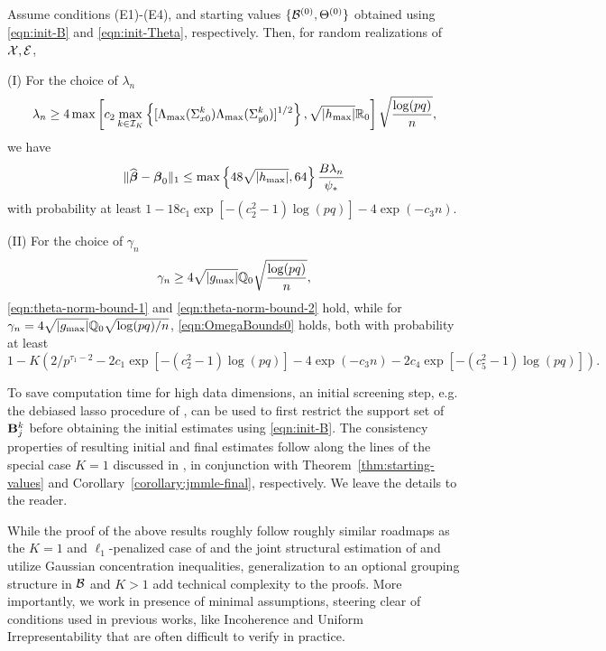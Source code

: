 \begin{corollary}\label{corollary:jmmle-final}
Assume conditions (E1)-(E4), and starting values $\{ {\cal{B}}^{(0)}, \Theta^{(0)} \}$ obtained using \eqref{eqn:init-B} and \eqref{eqn:init-Theta}, respectively. Then, for random realizations of ${\cal{X}}, {\cal{E}}$,
%

\vspace{1em}
\noindent (I) For the choice of $\lambda_n$
%
$$
\lambda_n \geq 4 \max \left[ c_2 \max_{k \in {\cal{I}}_K} \left\{ [\Lambda_{\max} (\Sigma_{x 0}^k) \Lambda_{\max} (\Sigma_{y 0}^k)]^{1/2} \right\}, \sqrt{| h_{\max}|} {\mathbb{R}}_0 \right] \sqrt{\frac{\log(pq)}{n}},
$$
%
we have
%
$$
\| \widehat {{\boldsymbol{\beta}}} - {\boldsymbol{\beta}}_0 \|_1 \leq \max \left\{ 48 \sqrt{ | h_{\max} |}, 64 \right\} \frac{B \lambda_n}{\psi_*}
$$
%
with probability at least $1 - 18 c_1 \exp[-(c_2^2-1) \log(pq)] - 4 \exp( -c_3 n)$.

\vspace{1em}
\noindent (II) For the choice of $\gamma_n$
%
$$
\gamma_n \geq 4 \sqrt{ | g_{\max} |} {\mathbb{Q}}_0 \sqrt{\frac{\log(pq)}{n}},
$$
%
\eqref{eqn:theta-norm-bound-1} and \eqref{eqn:theta-norm-bound-2} hold, while for $\gamma_n = 4 \sqrt{ | g_{\max} |} {\mathbb{Q}}_0 \sqrt{ \log (pq)/n}$, \eqref{eqn:OmegaBounds0} holds, both with probability at least
%
$$
1 - K(2/p^{\tau_1-2} - 2 c_1 \exp [-(c_2^2-1) \log(pq)] - 4 \exp (- c_3 n) - 2 c_4 \exp [-(c_5^2-1) \log(pq)]).
$$
\end{corollary}

\begin{Remark}
To save computation time for high data dimensions, an initial screening step, e.g. the debiased lasso procedure of \citet{JavanmardMontanari14}, can be used to first restrict the support set of ${\mathbf{B}}_j^k$ before obtaining the initial estimates using \eqref{eqn:init-B}. The consistency properties of resulting initial and final estimates follow along the lines of the special case $K=1$ discussed in \citet{LinEtal16}, in conjunction with Theorem~\ref{thm:starting-values} and Corollary~\ref{corollary:jmmle-final}, respectively. We leave the details to the reader.
\end{Remark}

{\colb
\begin{Remark}
While the proof of the above results roughly follow roughly similar roadmaps as the $K=1$ and $\ell_1$-penalized case of \citet{LinEtal16} and the joint structural estimation of \citet{MaMichailidis15} and utilize Gaussian concentration inequalities, generalization to an optional grouping structure in ${\cal{B}}$ and $K>1$ add technical complexity to the proofs. More importantly, we work in presence of minimal assumptions, steering clear of conditions used in previous works, like Incoherence \citep{LinEtal16} and Uniform Irrepresentability \citep{MaMichailidis15} that are often difficult to verify in practice.
\end{Remark}
}